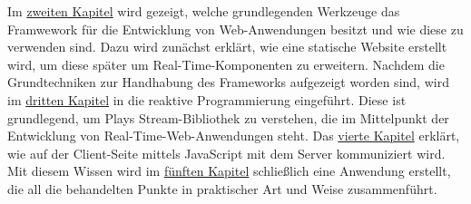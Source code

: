 Im \hyperref[cha:grundlagen]{zweiten Kapitel} wird gezeigt, welche grundlegenden Werkzeuge das Framwework für die Entwicklung von Web-Anwendungen besitzt und wie diese zu verwenden sind.
Dazu wird zunächst erklärt, wie eine statische Website erstellt wird, um diese später um Real-Time-Komponenten zu erweitern.
Nachdem die Grundtechniken zur Handhabung des Frameworks aufgezeigt worden sind, wird im \hyperref[cha:reaktive_programmierung]{dritten Kapitel} in die reaktive Programmierung eingeführt.
Diese ist grundlegend, um Plays Stream-Bibliothek zu verstehen, die im Mittelpunkt der Entwicklung von Real-Time-Web-Anwendungen steht.
Das \hyperref[cha:real_time_web]{vierte Kapitel} erklärt, wie auf der Client-Seite mittels JavaScript mit dem Server kommuniziert wird.
Mit diesem Wissen wird im \hyperref[cha:anwendung]{fünften Kapitel} schließlich eine Anwendung erstellt, die all die behandelten Punkte in praktischer Art und Weise zusammenführt.



